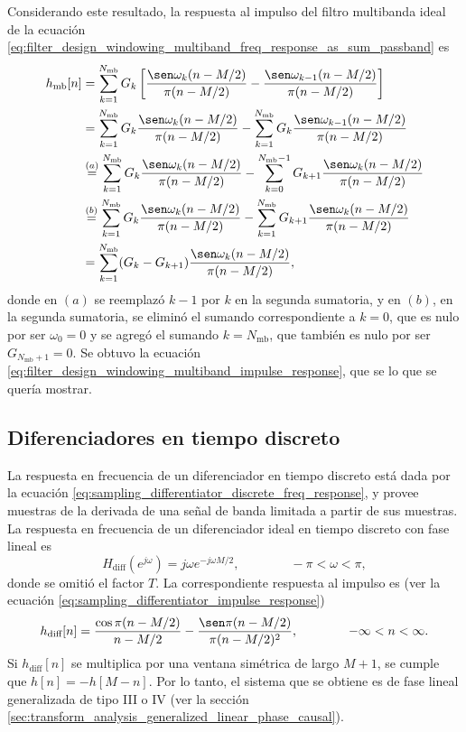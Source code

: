 \documentclass[a4paper]{report}
\begin{document}
Considerando este resultado, la respuesta al impulso del filtro multibanda ideal de la ecuación \ref{eq:filter_design_windowing_multiband_freq_response_as_sum_passband} es
\begin{align*}
 h_\textrm{mb}[n]&=\sum_{k=1}^{N_\textrm{mb}}G_k\left[\frac{\sen\omega_k(n-M/2)}{\pi(n-M/2)}-\frac{\sen\omega_{k-1}(n-M/2)}{\pi(n-M/2)}\right]\\
  &=\sum_{k=1}^{N_\textrm{mb}}G_k\frac{\sen\omega_k(n-M/2)}{\pi(n-M/2)}-\sum_{k=1}^{N_\textrm{mb}}G_k\frac{\sen\omega_{k-1}(n-M/2)}{\pi(n-M/2)}\\
  &\overset{(a)}{=}\sum_{k=1}^{N_\textrm{mb}}G_k\frac{\sen\omega_k(n-M/2)}{\pi(n-M/2)}-\sum_{k=0}^{N_\textrm{mb}-1}G_{k+1}\frac{\sen\omega_k(n-M/2)}{\pi(n-M/2)}\\
  &\overset{(b)}{=}\sum_{k=1}^{N_\textrm{mb}}G_k\frac{\sen\omega_k(n-M/2)}{\pi(n-M/2)}-\sum_{k=1}^{N_\textrm{mb}}G_{k+1}\frac{\sen\omega_k(n-M/2)}{\pi(n-M/2)}\\
  &=\sum_{k=1}^{N_\textrm{mb}}(G_k-G_{k+1})\frac{\sen\omega_k(n-M/2)}{\pi(n-M/2)},
\end{align*}
donde en \((a)\) se reemplazó \(k-1\) por \(k\) en la segunda sumatoria, y en \((b)\), en la segunda sumatoria, se eliminó el sumando correspondiente a \(k=0\), que es nulo por ser \(\omega_0=0\) y se agregó el sumando \(k=N_\textrm{mb}\), que también es nulo por ser \(G_{N_\textrm{mb}+1}=0\). Se obtuvo la ecuación \ref{eq:filter_design_windowing_multiband_impulse_response}, que se lo que se quería mostrar. 


\subsection{Diferenciadores en tiempo discreto}

La respuesta en frecuencia de un diferenciador en tiempo discreto está dada por la ecuación \ref{eq:sampling_differentiator_discrete_freq_response}, y provee muestras de la derivada de una señal de banda limitada a partir de sus muestras. La respuesta en frecuencia de un diferenciador ideal en tiempo discreto con fase lineal es
\[
 H_\textrm{diff}(e^{j\omega})=j\omega e^{-j\omega M/2},
 \qquad\qquad
 -\pi<\omega<\pi, 
\]
donde se omitió el factor \(T\). La correspondiente respuesta al impulso es (ver la ecuación \ref{eq:sampling_differentiator_impulse_response})
\[
 h_\textrm{diff}[n]=\frac{\cos\pi(n-M/2)}{n-M/2}-\frac{\sen\pi(n-M/2)}{\pi(n-M/2)^2},
 \qquad\qquad
 -\infty<n<\infty. 
\]
Si \(h_\textrm{diff}[n]\) se multiplica por una ventana simétrica de largo \(M+1\), se cumple que \(h[n]=-h[M-n]\). Por lo tanto, el sistema que se obtiene es de fase lineal generalizada de tipo III o IV (ver la sección \ref{sec:transform_analysis_generalized_linear_phase_causal}).
\end{document}
